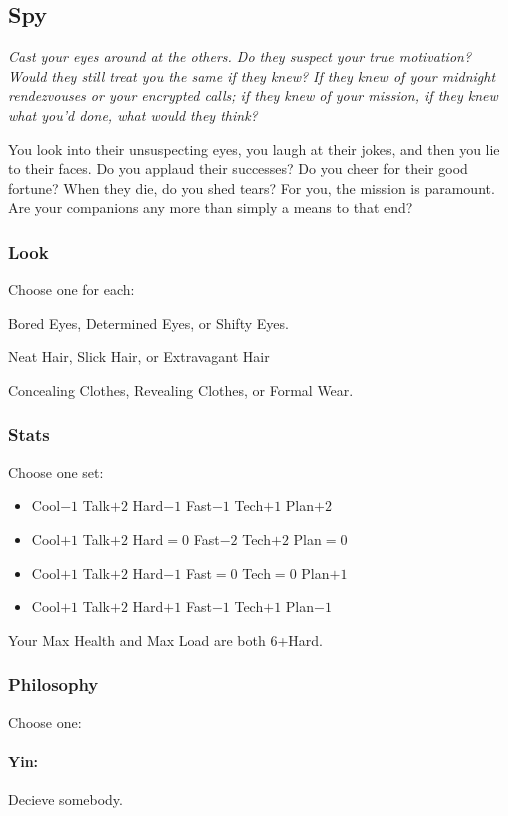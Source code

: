 \subsection{Spy}

{\itshape Cast your eyes around at the others. Do they suspect your
  true motivation? Would they still treat you the same if they knew?
  If they knew of your midnight rendezvouses or your encrypted calls;
  if they knew of your mission, if they knew what you'd done, what
  would they think?

You look into their unsuspecting eyes, you laugh at their jokes, and
then you lie to their faces. Do you applaud their successes? Do you
cheer for their good fortune? When they die, do you shed tears? For
you, the mission is paramount. Are your companions any more than
simply a means to that end?}

\subsubsection{Look}
Choose one for each:

Bored Eyes, Determined Eyes, or Shifty Eyes.

Neat Hair, Slick Hair, or Extravagant Hair

Concealing Clothes, Revealing Clothes, or Formal Wear.

\subsubsection{Stats}
Choose one set:
\begin{itemize}
\setlength\itemsep{0em}
\item Cool$-1$ Talk$+2$ Hard$-1$ Fast$-1$ Tech$+1$ Plan$+2$
\item Cool$+1$ Talk$+2$ Hard${=}0$ Fast$-2$ Tech$+2$ Plan${=}0$
\item Cool$+1$ Talk$+2$ Hard$-1$ Fast${=}0$ Tech${=}0$ Plan$+1$
\item Cool$+1$ Talk$+2$ Hard$+1$ Fast$-1$ Tech$+1$ Plan$-1$
\end{itemize}

Your Max Health and Max Load are both 6+Hard.

\subsubsection{Philosophy}
Choose one:
\paragraph{Yin:} Decieve somebody.
